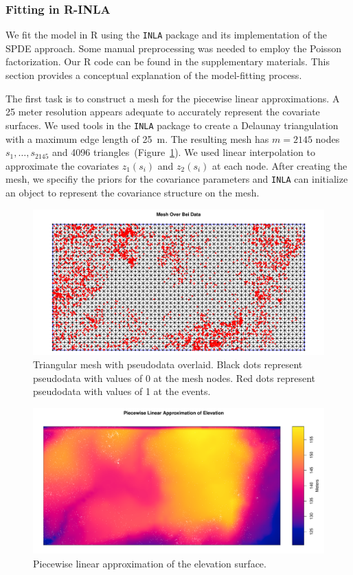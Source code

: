 \documentclass[]{interact}
\begin{document}
\subsubsection{Fitting in R-INLA}

We fit the model in R using the \texttt{INLA} package and its implementation of
the SPDE approach. Some manual preprocessing was needed to employ the Poisson
factorization. Our R code can be found in the supplementary materials. This
section provides a conceptual explanation of the model-fitting process.

The first task is to construct a mesh for the piecewise linear approximations.
A 25 meter resolution appears adequate to accurately represent the covariate
surfaces. We used tools in the \texttt{INLA} package to create a Delaunay
triangulation with a maximum edge length of 25~m. The resulting mesh has
\(m = 2145\) nodes \(s_{1},  \dots, s_{2145}\) and 4096
triangles~(Figure~\ref{beimesh}). We used linear interpolation to approximate
the covariates \(z_{1}(s_{i})\) and \(z_{2}(s_{i})\) at each node. After
creating the mesh, we specifiy the priors for the covariance parameters and
\texttt{INLA} can initialize an object to represent the covariance structure
on the mesh.

\begin{figure}[h]
\includegraphics[width=\textwidth]{figures/bei_mesh.pdf}
\caption{Triangular mesh with pseudodata overlaid. Black dots represent
pseudodata with values of 0 at the mesh nodes. Red dots represent pseudodata
with values of 1 at the events.}
\label{beimesh}
\end{figure}

\begin{figure}[h]
\includegraphics[width=\textwidth]{figures/bei_elev_mesh.pdf}
\caption{Piecewise linear approximation of the elevation surface.}
\label{beielevmesh}
\end{figure}
\end{document}
